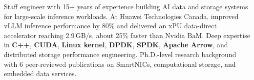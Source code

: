 

\begin{cvparagraph}

Staff engineer with 15+ years of experience building AI data and storage systems for large-scale inference workloads. At Huawei Technologies Canada, improved vLLM inference performance by 80\% and delivered an xPU data-direct accelerator reaching 2.9\,GB/s, about 25\% faster than Nvidia BaM. Deep expertise in \textbf{C++}, \textbf{CUDA}, \textbf{Linux kernel}, \textbf{DPDK}, \textbf{SPDK}, \textbf{Apache Arrow}, and distributed storage performance engineering. Ph.D.-level research background with 6 peer-reviewed publications on SmartNICs, computational storage, and embedded data services.
\end{cvparagraph}

